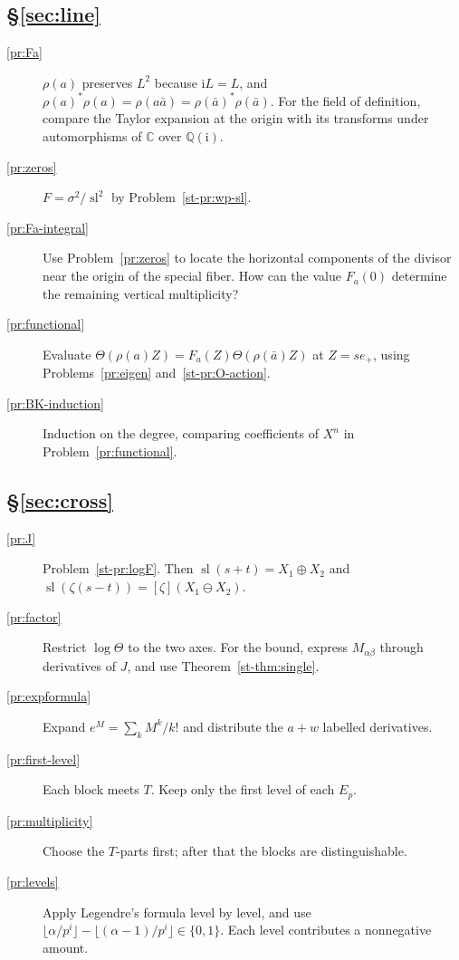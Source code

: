 \documentclass[reqno]{amsart}
\theoremstyle{definition}
\theoremstyle{plain}
\newcommand{\Q}{\mathbb{Q}}
\newcommand{\C}{\mathbb{C}}
\newcommand{\ii}{\mathrm{i}}
\newcommand{\sll}{\operatorname{sl}}
\begin{document}
\subsection*{\S\ref{sec:line}}
\begin{description}
\item[\ref{pr:Fa}] \(\rho(a)\) preserves \(L^2\) because \(\ii L = L\), and \(\rho(a)^*\rho(a) = \rho(a\bar a) = \rho(\bar a)^*\rho(\bar a)\).  For the field of definition, compare the Taylor expansion at the origin with its transforms under automorphisms of \(\C\) over \(\Q(\ii)\).
\item[\ref{pr:zeros}] \(F = \sigma^2/\sll^2\) by Problem~\ref{st-pr:wp-sl}.
\item[\ref{pr:Fa-integral}] Use Problem~\ref{pr:zeros} to locate the horizontal components of the divisor near the origin of the special fiber.  How can the value \(F_a(0)\) determine the remaining vertical multiplicity?
\item[\ref{pr:functional}] Evaluate \(\Theta(\rho(a)Z) = F_a(Z)\Theta(\rho(\bar a)Z)\) at \(Z = s e_+\), using Problems~\ref{pr:eigen} and~\ref{st-pr:O-action}.
\item[\ref{pr:BK-induction}] Induction on the degree, comparing coefficients of \(X^n\) in Problem~\ref{pr:functional}.
\end{description}

\subsection*{\S\ref{sec:cross}}
\begin{description}
\item[\ref{pr:J}] Problem~\ref{st-pr:logF}.  Then \(\sll(s+t) = X_1 \oplus X_2\) and \(\sll(\zeta(s-t)) = [\zeta](X_1 \ominus X_2)\).
\item[\ref{pr:factor}] Restrict \(\log\Theta\) to the two axes.  For the bound, express \(M_{\alpha\beta}\) through derivatives of \(J\), and use Theorem~\ref{st-thm:single}.
\item[\ref{pr:expformula}] Expand \(e^M = \sum_k M^k/k!\) and distribute the \(a + w\) labelled derivatives.
\item[\ref{pr:first-level}] Each block meets \(T\).  Keep only the first level of each \(E_p\).
\item[\ref{pr:multiplicity}] Choose the \(T\)-parts first; after that the blocks are distinguishable.
\item[\ref{pr:levels}] Apply Legendre's formula level by level, and use \(\lfloor \alpha/p^i \rfloor - \lfloor (\alpha-1)/p^i \rfloor \in \{0, 1\}\).  Each level contributes a nonnegative amount.
\end{description}
\end{document}
